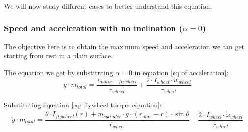 We will now study different cases to better understand this equation.
\subsubsection{Speed and acceleration with no inclination ($\alpha = 0$)}
The objective here is to obtain the maximum speed and acceleration we can get starting from rest in a plain surface.

The equation we get by substituting $\alpha = 0$ in equation \ref{eq of acceleration}:
\[\ddot{y}\cdot m_{total} = \frac{\tau_{motor-flywheel}}{r_{wheel}} +\frac{2\cdot I_{wheel} \cdot  \dot{w}_{wheel}}{r_{wheel}}\]

Substituting equation \ref{eq: flywheel torque equation}:
\begin{equation}\label{eq: no inclintation}
    \ddot{y}\cdot m_{total} = \frac{\ddot{\theta}\cdot I_{flywheel}(r) +
    m_{cylinder} \cdot  g \cdot  (r_{max} - r) \cdot  \sin{\theta}}{r_{wheel}} +\frac{2\cdot I_{wheel} \cdot  \dot{\omega}_{wheel}}{r_{wheel}}
\end{equation}


